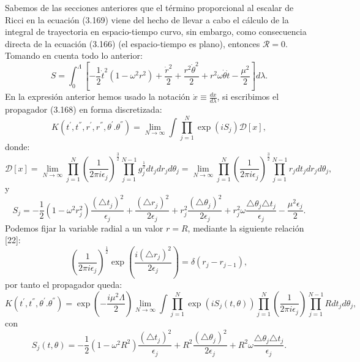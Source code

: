 Sabemos de las secciones anteriores que el término proporcional al escalar de Ricci en la ecuación (3.169) viene del hecho de llevar a cabo el cálculo de la integral de trayectoria en espacio-tiempo curvo, sin embargo, como consecuencia directa de la ecuación (3.166) (el espacio-tiempo es plano), entonces $\mathcal{R}=0$. Tomando en cuenta todo lo anterior:
\begin{equation}
S=\int_{0}^{\Lambda}\left[-\frac{1}{2}\dot{t}^{2}(1-\omega^{2}r^{2})+\frac{\dot{r}^{2}}{2}+\frac{r^{2}\dot{\theta}^{2}}{2}+r^{2}\omega\dot{\theta}\dot{t}-\frac{\mu^{2}}{2}\right]d\lambda.
\end{equation} 
En la expresión anterior hemos usado la notación $\dot{x}\equiv\frac{dx}{d\lambda}$, si escribimos el propagador (3.168) en forma discretizada:
\begin{equation}
K(t^{'},t^{''},r^{'},r^{''},\theta^{'}.\theta^{''})=\lim_{N\to\infty}\int\prod_{j=1}^{N}\exp(iS_{j})\mathcal{D}[x],
\end{equation}
donde:
\begin{equation}
\mathcal{D}[x]=\lim_{N\to\infty}\prod_{j=1}^{N}\left(\frac{1}{2\pi i\epsilon_{j}}\right)^{\frac{3}{2}}\prod_{j=1}^{N-1}g_{j}^{\frac{1}{2}}dt_{j}dr_{j}d\theta_{j}=\lim_{N\to\infty}\prod_{j=1}^{N}\left(\frac{1}{2\pi i\epsilon_{j}}\right)^{\frac{3}{2}}\prod_{j=1}^{N-1}r_{j}dt_{j}dr_{j}d\theta_{j},
\end{equation}
y
\begin{equation}
S_{j}=-\frac{1}{2}(1-\omega^{2}r_{j}^{2})\frac{(\triangle t_{j})^{2}}{\epsilon_{j}}+\frac{(\triangle r_{j})^{2}}{2\epsilon_{j}}+r_{j}^{2}\frac{(\triangle\theta_{j})^{2}}{2\epsilon_{j}}+r_{j}^{2}\omega\frac{\triangle\theta_{j}\triangle t_{j}}{\epsilon_{j}}-\frac{\mu^{2}\epsilon_{j}}{2}.
\end{equation}
Podemos fijar la variable radial a un valor $r=R$, mediante la siguiente relación [22]:
\begin{equation}
\left(\frac{1}{2\pi i\epsilon_{j}}\right)^{\frac{1}{2}}\exp\left(\frac{i(\triangle r_{j})^{2}}{2\epsilon_{j}}\right)=\delta(r_{j}-r_{j-1}),
\end{equation}
por tanto el propagador queda:
\begin{equation}
K(t^{'},t^{''},\theta^{'}.\theta^{''})=\exp\left(-\frac{i\mu^{2}\Lambda}{2}\right)\lim_{N\to\infty}\int\prod_{j=1}^{N}\exp(iS_{j}(t,\theta))\prod_{j=1}^{N}\left(\frac{1}{2\pi i\epsilon_{j}}\right)\prod_{j=1}^{N-1}Rdt_{j}d\theta_{j},
\end{equation}
con
\begin{equation}
S_{j}(t,\theta)=-\frac{1}{2}(1-\omega^{2}R^{2})\frac{(\triangle t_{j})^{2}}{\epsilon_{j}}+R^{2}\frac{(\triangle\theta_{j})^{2}}{2\epsilon_{j}}+R^{2}\omega\frac{\triangle\theta_{j}\triangle t_{j}}{\epsilon_{j}}.
\end{equation}

